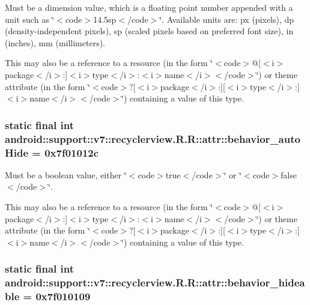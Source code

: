 Must be a dimension value, which is a floating point number appended with a unit such as \char`\"{}$<$code$>$14.5sp$<$/code$>$\char`\"{}. Available units are: px (pixels), dp (density-independent pixels), sp (scaled pixels based on preferred font size), in (inches), mm (millimeters). 

This may also be a reference to a resource (in the form \char`\"{}$<$code$>$@\mbox{[}$<$i$>$package$<$/i$>$:\mbox{]}$<$i$>$type$<$/i$>$:$<$i$>$name$<$/i$>$$<$/code$>$\char`\"{}) or theme attribute (in the form \char`\"{}$<$code$>$?\mbox{[}$<$i$>$package$<$/i$>$:\mbox{]}\mbox{[}$<$i$>$type$<$/i$>$:\mbox{]}$<$i$>$name$<$/i$>$$<$/code$>$\char`\"{}) containing a value of this type. \hypertarget{classandroid_1_1support_1_1v7_1_1recyclerview_1_1_r_1_1attr_aeeaaa32399b4924c1e62cd8dbd91b45}{
\subsubsection[{behavior\_\-autoHide}]{\setlength{\rightskip}{0pt plus 5cm}static final int android::support::v7::recyclerview.R.R::attr::behavior\_\-autoHide = 0x7f01012c}}
\label{classandroid_1_1support_1_1v7_1_1recyclerview_1_1_r_1_1attr_aeeaaa32399b4924c1e62cd8dbd91b45}


Must be a boolean value, either \char`\"{}$<$code$>$true$<$/code$>$\char`\"{} or \char`\"{}$<$code$>$false$<$/code$>$\char`\"{}. 

This may also be a reference to a resource (in the form \char`\"{}$<$code$>$@\mbox{[}$<$i$>$package$<$/i$>$:\mbox{]}$<$i$>$type$<$/i$>$:$<$i$>$name$<$/i$>$$<$/code$>$\char`\"{}) or theme attribute (in the form \char`\"{}$<$code$>$?\mbox{[}$<$i$>$package$<$/i$>$:\mbox{]}\mbox{[}$<$i$>$type$<$/i$>$:\mbox{]}$<$i$>$name$<$/i$>$$<$/code$>$\char`\"{}) containing a value of this type. \hypertarget{classandroid_1_1support_1_1v7_1_1recyclerview_1_1_r_1_1attr_f4682b534fcc0653dd3445cdfebbaea4}{
\subsubsection[{behavior\_\-hideable}]{\setlength{\rightskip}{0pt plus 5cm}static final int android::support::v7::recyclerview.R.R::attr::behavior\_\-hideable = 0x7f010109}}
\label{classandroid_1_1support_1_1v7_1_1recyclerview_1_1_r_1_1attr_f4682b534fcc0653dd3445cdfebbaea4}


